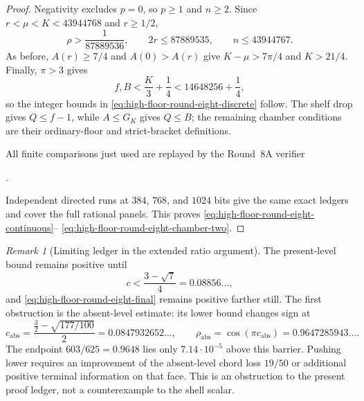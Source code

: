 \documentclass[11pt]{article}
\theoremstyle{remark}
\newtheorem{remark}[theorem]{Remark}
\begin{document}
\begin{proof}
Negativity excludes $p=0$, so $p\geq1$ and $n\geq2$.  Since
$r<\mu<K<43944768$ and $r\geq1/2$,
\[
 \rho>\frac1{87889536},\qquad
 2r\leq87889535,\qquad n\leq43944767.
\]
As before, $A(r)\geq7/4$ and $A(0)>A(r)$ give
$K-\mu>7\pi/4$ and $K>21/4$.  Finally, $\pi>3$ gives
\[
 f,B<\frac K3+\frac14<14648256+\frac14,
\]
so the integer bounds in
\eqref{eq:high-floor-round-eight-discrete} follow.  The shelf drop gives
$Q\leq f-1$, while $A\leq G_K$ gives $Q\leq B$; the remaining chamber
conditions are their ordinary-floor and strict-bracket definitions.

All finite comparisons just used are replayed by the Round~8A verifier
\begin{center}
 \small{}.
\end{center}
Independent directed runs at $384$, $768$, and $1024$ bits give the same
exact ledgers and cover the full rational panels.  This proves
\eqref{eq:high-floor-round-eight-continuous}--%
\eqref{eq:high-floor-round-eight-chamber-two}.
\end{proof}

\begin{remark}[Limiting ledger in the extended ratio argument]
\label{rem:high-floor-round-eight-obstruction}
The present-level bound remains positive until
\[
 c<\frac{3-\sqrt7}{4}=0.08856\ldots,
\]
and \eqref{eq:high-floor-round-eight-final} remains positive farther
still.  The first obstruction is the absent-level estimate: its lower
bound changes sign at
\[
 c_{\mathrm{abs}}
 =\frac{\frac32-\sqrt{177/100}}2
 =0.0847932652\ldots,
\qquad
 \rho_{\mathrm{abs}}=\cos(\pi c_{\mathrm{abs}})
 =0.9647285943\ldots.
\]
The endpoint $603/625=0.9648$ lies only
$7.14\mathbin{\cdot}10^{-5}$ above this barrier.  Pushing lower requires
an improvement of the absent-level chord loss $19/50$ or additional
positive terminal information on that face.  This is an obstruction to
the present proof ledger, not a counterexample to the shell scalar.
\end{remark}
\end{document}
